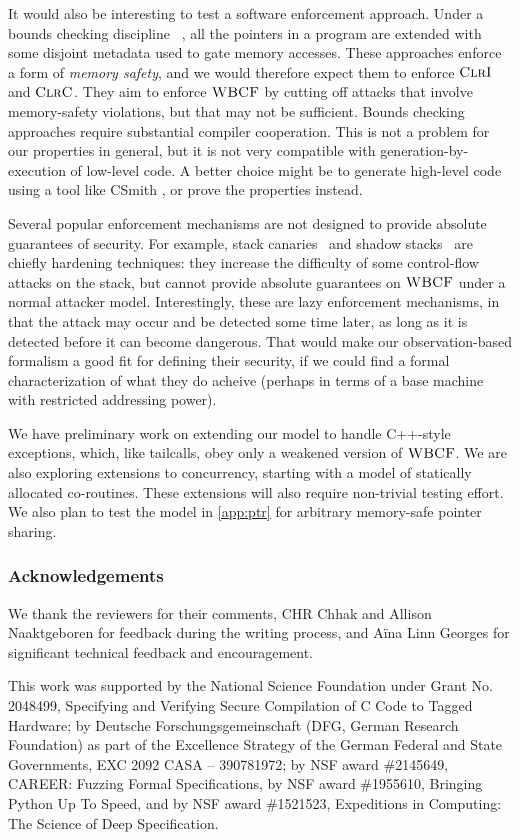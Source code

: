 \documentclass[10pt,conference]{ieeetran}%
\theoremstyle{definition}
\begin{document}
It would also be interesting to test a software enforcement approach.
Under a bounds checking discipline~%
\cite{NagarakatteZMZ09}, all the pointers
in a program are extended with some disjoint metadata %
used
to gate memory accesses. These approaches enforce a form of \emph{memory safety},
and we would therefore expect them to enforce \(\textnormal{\sc ClrI}\) and \(\textnormal{\sc ClrC}\). They aim
to enforce \(\textnormal{\sc WBCF}\) by cutting off attacks that involve memory-safety violations,
but that may not be sufficient.
Bounds checking approaches require substantial compiler cooperation. This is not a
problem for our properties in general, but it is not very compatible with
generation-by-execution of low-level code. A better choice might be to generate
high-level code using a tool like CSmith \cite{DBLP:conf/pldi/YangCER11}, or prove the properties instead.

Several popular enforcement mechanisms are not designed to provide
absolute guarantees of security. For example, stack canaries~\cite{Cowan+98}
and shadow stacks~\cite{Dang+15,Shanbhogue+19}
are chiefly hardening techniques: they increase the difficulty
of some control-flow attacks on the stack, but cannot provide absolute
guarantees on \(\textnormal{\sc WBCF}\) under a normal attacker model.
%
Interestingly, these are lazy enforcement mechanisms, in that
the attack may occur and be detected some time later, as long as
it is detected before it can become dangerous. That would make our
observation-based formalism a good fit for defining their security,
if we could find a formal characterization of what they do acheive
(perhaps in terms of a base machine with restricted addressing power).

We have preliminary work on extending our model to handle C++-style
exceptions, which, like tailcalls, obey only a weakened version of \(\textnormal{\sc WBCF}\).
We are also exploring extensions to concurrency, starting with a model of
statically allocated co-routines.  These extensions will also require non-trivial
testing effort.  We also plan to test
the model in \cref{app:ptr} for arbitrary memory-safe pointer sharing.

\subsubsection*{Acknowledgements}

We thank the reviewers for their comments, CHR Chhak and Allison Naaktgeboren for
feedback during the writing process, and A\"ina Linn Georges for significant technical
feedback and encouragement.

This work was supported by the National Science Foundation under Grant No. 2048499, Specifying and Verifying Secure Compilation of C Code to Tagged Hardware;
by Deutsche Forschungsgemeinschaft (DFG, German Research Foundation) as part of the Excellence Strategy of the German Federal and State Governments, EXC 2092 CASA -- 390781972;
by NSF award \#2145649, CAREER: Fuzzing Formal Specifications,
by
NSF award \#1955610, Bringing Python Up To Speed,
and by %
NSF award \#1521523, Expeditions in Computing: The Science of Deep
  Specification.




\end{document}
